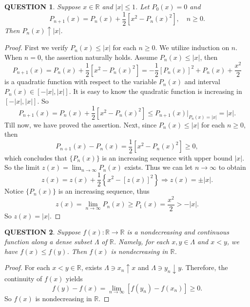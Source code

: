 \documentclass[12pt]{article}
\renewcommand{\(}{\left(}%
\renewcommand{\)}{\right)}%
\renewcommand{\[}{\left[}%
\renewcommand{\]}{\right]}%
\renewcommand{\r}{\mathbb{R}}
\newtheorem{question}{QUESTION}[section]}
\newtheorem{proof}{Proof.}}
\begin{document}
  \begin{question}
   Suppose $x\in\r$ and $|x|\leq 1$. Let $P_0(x)=0$ and
   \begin{equation*}
    P_{n+1}(x)=P_n(x)+\frac{1}{2}\[x^2-P_n(x)^2 \],\quad n\geq 0.
   \end{equation*}
   Then $P_n(x)\uparrow |x|$.
  \end{question}
  \begin{proof}
   First we verify $P_n(x)\leq |x|$ for each $n\geq 0$. We utilize induction on $n.$ When $n=0$, the assertion naturally holds. Assume $P_n(x)\leq |x|$, then
   \begin{equation*}
    P_{n+1}(x)=P_n(x)+\frac{1}{2}\[x^2-P_n(x)^2 \]=-\frac{1}{2}\[P_n(x)\]^2+P_n(x)+\frac{x^2}{2}
   \end{equation*}
   is a quadratic function with respect to the variable $P_n(x)$ and interval $P_n(x)\in[-|x|,|x|]$. It is easy to know the quadratic function is increasing in $[-|x|,|x|]$. So
   \begin{equation*}
    P_{n+1}(x)=P_n(x)+\frac{1}{2}\[x^2-P_n(x)^2 \]\leq P_{n+1}(x)\big|_{P_n(x)=|x|}= |x|.
   \end{equation*}
   Till now, we have proved the assertion. Next, since $P_n(x)\leq |x|$ for each $n\geq 0$, then
   \begin{equation*}
    P_{n+1}(x)-P_n(x)=\frac{1}{2}\[x^2-P_n(x)^2 \]\geq 0,
   \end{equation*}
   which concludes that $\{P_n(x)\}$ is an increasing sequence with upper bound $|x|$. So the limit $z(x)=\lim_{n\to\infty}P_n(x)$ exists. Thus we can let $n\to\infty$ to obtain
   \begin{equation*}
    z(x)=z(x)+\frac{1}{2}\left\{x^2-\[z(x)\]^2\right\}\Longrightarrow z(x)=\pm|x|.
   \end{equation*}
   Notice $\{P_n(x)\}$ is an increasing sequence, thus
   \begin{equation*}
    z(x)=\lim_{n\to\infty}P_n(x)\geq P_1(x)=\frac{x^2}{2}>-|x|.
   \end{equation*}
   So $z(x)=|x|$.
  \end{proof}

  \begin{question}
   Suppose $f(x):\r\to\r$ is a nondecreasing and continuous function along a dense subset $\Lambda $ of $\r$. Namely, for each $x,y\in\Lambda$ and $x<y$, we have $f(x)\leq f(y)$. Then $f(x)$ is nondecreasing in $\r$.
  \end{question}
  \begin{proof}
   For each $x<y\in\r$, exists $\Lambda\ni x_n\uparrow x$ and $\Lambda\ni y_n\downarrow y$. Therefore, the continuity of $f(x)$ yields
   \begin{equation*}
    f(y)-f(x)=\lim_{n\to\infty}[f(y_n)-f(x_n)]\geq 0.
   \end{equation*}
   So $f(x)$ is nondecreasing in $\r$.
  \end{proof}
\end{document}
